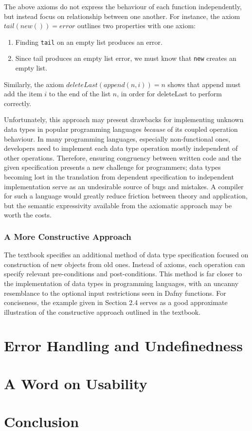 \documentclass{article}
\begin{document}
The above axioms do not express the behaviour of each function independently, but instead focus on relationship between one another.
For instance, the axiom $tail(new()) = error$ outlines two properties with one axiom:
\begin{enumerate}
    \item Finding \texttt{tail} on an empty list produces an error.
    \item Since tail produces an empty list error, we must know that \texttt{new} creates an empty list.
\end{enumerate}
Similarly, the axiom $deleteLast(append(n, i)) = n$ shows that append must add the item $i$
to the end of the list $n$, in order for deleteLast to perform correctly.

Unfortunately, this approach may present drawbacks for implementing unknown data types in popular programming languages
\textit{because} of its coupled operation behaviour. In many programming languages, especially non-functional ones,
developers need to implement each data type operation mostly independent of other operations. Therefore, ensuring congruency
between written code and the given specification presents a new challenge for programmers;
data types becoming lost in the translation from dependent specification to independent implementation serve
as an undesirable source of bugs and mistakes. A compiler for such a language would greatly reduce friction between
theory and application, but the semantic expressivity available from the axiomatic approach may be worth the costs.

\subsubsection{A More Constructive Approach}

The textbook \cite{ADTspec} specifies an additional method of data type specification focused on construction
of new objects from old ones. Instead of axioms, each operation can specify relevant pre-conditions and post-conditions.
This method is far closer to the implementation of data types in programming languages, with an uncanny resemblance
to the optional input restrictions seen in Dafny functions. For conciseness, the example given in Section 2.4
serves as a good approximate illustration of the constructive approach outlined in the textbook.

\section{Error Handling and Undefinedness}
\section{A Word on Usability}
\section{Conclusion}


\nocite{*} %
\printbibliography %
\end{document}
